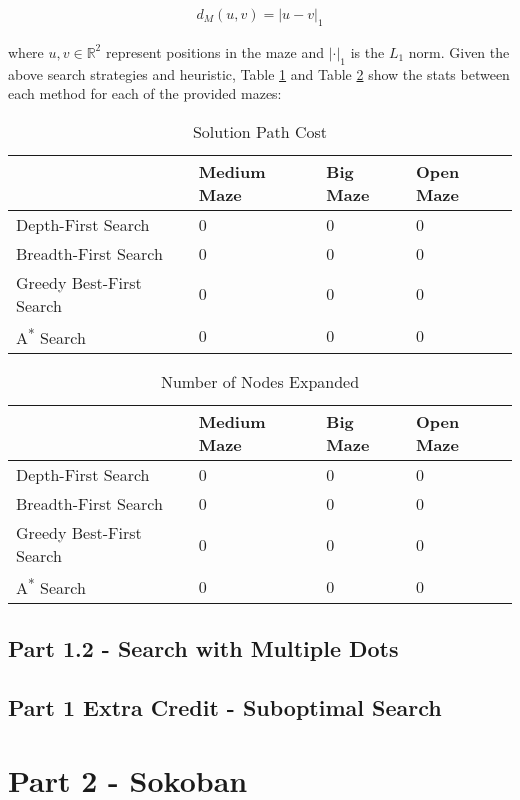 \documentclass{article}[12pt]
\begin{document}
   \begin{align*}
   d_M(u,v) = |u - v|_1
   \end{align*}
   
   where $u, v \in \mathbb{R}^2$ represent positions in the maze and $|\cdot|_1$ is the $L_1$ norm. Given the above search strategies and heuristic, Table \ref{tab:sol11} and Table \ref{tab:nnode11} show the stats between each method for each of the provided mazes:
   
   \begin{table}[ht]
   \centering
   \begin{tabular}[ht]{l | l | l | l  }
   \hline
    & Medium Maze & Big Maze & Open Maze\\
    \hline \hline 
   Depth-First Search & 0 & 0 & 0 \\
   Breadth-First Search & 0 & 0 & 0 \\
   Greedy Best-First Search & 0 & 0 & 0 \\
   A\textsuperscript{*} Search & 0 & 0 & 0 \\
   \hline
   \end{tabular}
   \caption{Solution Path Cost} \label{tab:sol11}
   \end{table}
   
   \begin{table}[ht]
   \centering
   \begin{tabular}[ht]{l | l | l | l  }
   \hline
    & Medium Maze & Big Maze & Open Maze\\
    \hline \hline 
   Depth-First Search & 0 & 0 & 0 \\
   Breadth-First Search & 0 & 0 & 0 \\
   Greedy Best-First Search & 0 & 0 & 0 \\
   A\textsuperscript{*} Search & 0 & 0 & 0 \\
   \hline
   \end{tabular}
   \caption{Number of Nodes Expanded} \label{tab:nnode11}
   \end{table}
   
   \subsection{Part 1.2 - Search with Multiple Dots}
   
   
   \subsection{Part 1 Extra Credit - Suboptimal Search}
   
   \section{Part 2 - Sokoban}
   
\end{document}
